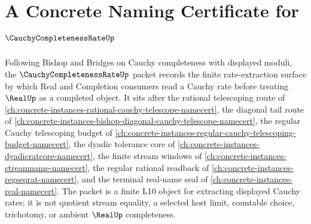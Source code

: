 \chapter{A Concrete Naming Certificate for $\CauchyCompletenessRateUp$}
\label{ch:concrete-instances-cauchy-completeness-rate-namecert}

Following Bishop and Bridges on Cauchy completeness with displayed moduli, the $\CauchyCompletenessRateUp$ packet records the finite rate-extraction surface by which Real and Completion consumers read a Cauchy rate before treating $\RealUp$ as a completed object. It sits after the rational telescoping route of \autoref{ch:concrete-instances-rational-cauchy-telescope-namecert}, the diagonal tail route of \autoref{ch:concrete-instances-bishop-diagonal-cauchy-telescope-namecert}, the regular Cauchy telescoping budget of \autoref{ch:concrete-instances-regular-cauchy-telescoping-budget-namecert}, the dyadic tolerance core of \autoref{ch:concrete-instances-dyadicratcore-namecert}, the finite stream windows of \autoref{ch:concrete-instances-streamname-namecert}, the regular rational readback of \autoref{ch:concrete-instances-regseqrat-namecert}, and the terminal real-name seal of \autoref{ch:concrete-instances-real-namecert}. The packet is a finite L10 object for extracting displayed Cauchy rates; it is not quotient stream equality, a selected host limit, countable choice, trichotomy, or ambient $\RealUp$ completeness.

